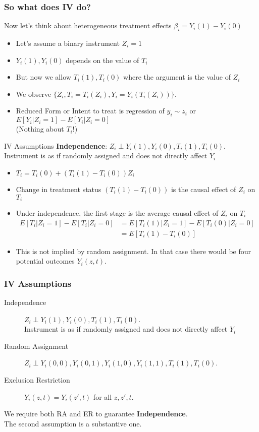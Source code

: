 \documentclass[xcolor=pdftex,dvipsnames,table,mathserif,aspectratio=169]{beamer}
\begin{document}
\begin{frame}
\frametitle{So what does IV do?}
Now let's think about \alert{heterogeneous treatment effects} $\beta_i = Y_i(1) - Y_i(0)$
\begin{itemize}
\item Let's assume a binary instrument $Z_i=1$
\item $Y_i(1),Y_i(0)$ depends on the value of $T_i$
\item But now we allow $T_i(1),T_i(0)$ where the argument is the value of $Z_i$
\item We observe $\{Z_i, T_i = T_i(Z_i), Y_i = Y_i(T_i(Z_i))\}$.
\item \alert{Reduced Form} or \alert{Intent to treat} is regression of $y_i \sim z_i$ or $E[Y_i | Z_i =1] - E[Y_i | Z_i =0]$\\
(Nothing about $T_i$!)
\end{itemize}
\end{frame}

\begin{frame}{IV Assumptions}
\textbf{Independence}: $Z_i \perp Y_i(1), Y_i(0), T_i(1), T_i(0)$. Instrument is as if randomly assigned and does not directly affect $Y_i$
\begin{itemize}
\item $T_i = T_i(0) + (T_i(1) - T_i(0)) Z_i$
\item Change in treatment status $(T_i(1) - T_i(0))$ is the causal effect of $Z_i$ on $T_i$
\item Under independence, the \alert{first stage} is the average causal effect of $Z_i$ on $T_i$
\begin{align*}
E[T_i | Z_i = 1] - E[T_i | Z_i = 0] 
&= E[T_i(1) | Z_i = 1] - E[T_i(0) | Z_i = 0]\\
&= E[T_i(1)-T_i(0)]
\end{align*}
\item This is not implied by random assignment. In that case there would be four potential outcomes $Y_i(z,t)$.
\end{itemize}
\end{frame}

\begin{frame}
\frametitle{IV Assumptions}
\begin{description}
\item [Independence] $Z_i \perp Y_i(1), Y_i(0), T_i(1), T_i(0)$.\\
 Instrument is as if randomly assigned and does not directly affect $Y_i$
\item [Random Assignment] $Z_i \perp Y_i(0,0), Y_i(0,1), Y_i(1,0), Y_i(1,1), T_i(1), T_i(0)$. 
\item [Exclusion Restriction] $Y_i(z,t) = Y_i(z',t)$ for all $z,z',t$. 
\end{description}
We require \alert{both RA and ER} to guarantee \textbf{Independence}.\\
The second assumption is a substantive one.
\end{frame}
\end{document}
